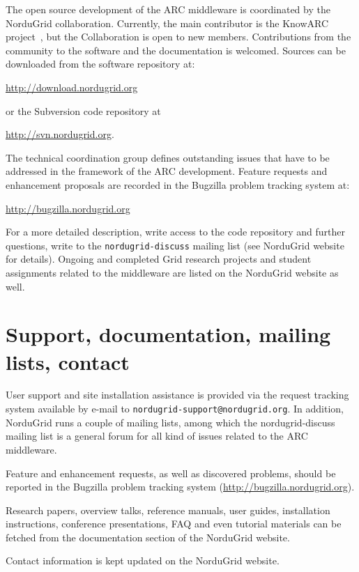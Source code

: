 \documentclass{article}                            %
\begin{document}
The open source development of the ARC middleware is coordinated by the
NorduGrid collaboration. Currently, the main contributor is the KnowARC
project~\cite{knowarc}, but the Collaboration is open to new members.
Contributions from the community to the software and the documentation is
welcomed. Sources can be downloaded from the software repository at:

\url{http://download.nordugrid.org}

or the Subversion code repository at

\url{http://svn.nordugrid.org}.

The technical coordination group defines outstanding issues that have
to be addressed in the framework of the ARC development. Feature
requests and enhancement proposals are recorded in the Bugzilla problem
tracking system at:

 \url{http://bugzilla.nordugrid.org}

For a more detailed description, write access to the code repository and
further questions, write to the \texttt{nordugrid-discuss} mailing list (see
NorduGrid website~\cite{nordugrid} for details). Ongoing and completed Grid
research projects and student assignments related to the middleware are listed
on the NorduGrid website as well.


\section{Support, documentation, mailing lists, contact}
\label{sec:support}

User support and site installation assistance is provided via the
request tracking system available by e-mail to
\texttt{nordugrid-support@nordugrid.org}.
In addition, NorduGrid runs a couple of mailing lists, among which the
nordugrid-discuss mailing list is a general forum for all kind of
issues related to the ARC middleware.

Feature and enhancement requests, as well as discovered problems, should be
reported in the Bugzilla problem tracking system
(\url{http://bugzilla.nordugrid.org}).

Research papers, overview talks, reference manuals, user guides,
installation instructions, conference presentations, FAQ and even
tutorial materials can be fetched from the documentation section of the
NorduGrid website.

Contact information is kept updated on the NorduGrid website.


\end{document}
